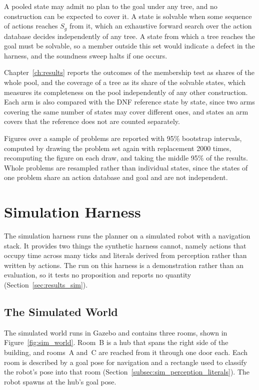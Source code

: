     A pooled state may admit no plan to the goal under any tree, and no construction can be expected to cover it.
    A state is solvable when some sequence of actions reaches $S_g$ from it, which an exhaustive forward search over the action database decides independently of any tree.
    A state from which a tree reaches the goal must be solvable, so a member outside this set would indicate a defect in the harness, and the soundness sweep halts if one occurs.

    Chapter~\ref{ch:results} reports the outcomes of the membership test as shares of the whole pool, and the coverage of a tree as its share of the solvable states, which measures its completeness on the pool independently of any other construction.
    Each arm is also compared with the DNF reference state by state, since two arms covering the same number of states may cover different ones, and states an arm covers that the reference does not are counted separately.

    Figures over a sample of problems are reported with 95\% bootstrap intervals, computed by drawing the problem set again with replacement 2000 times, recomputing the figure on each draw, and taking the middle 95\% of the results.
    Whole problems are resampled rather than individual states, since the states of one problem share an action database and goal and are not independent.

\section{Simulation Harness}
\label{sec:sim_harness}
    The simulation harness runs the planner on a simulated robot with a navigation stack.
    It provides two things the synthetic harness cannot, namely actions that occupy time across many ticks and literals derived from perception rather than written by actions.
    The run on this harness is a demonstration rather than an evaluation, so it tests no proposition and reports no quantity (Section~\ref{sec:results_sim}).

    \subsection{The Simulated World}
    \label{subsec:sim_world}
    The simulated world runs in Gazebo and contains three rooms, shown in Figure~\ref{fig:sim_world}.
    Room~B is a hub that spans the right side of the building, and rooms~A and~C are reached from it through one door each.
    Each room is described by a goal pose for navigation and a rectangle used to classify the robot's pose into that room (Section~\ref{subsec:sim_perception_literals}).
    The robot spawns at the hub's goal pose.

